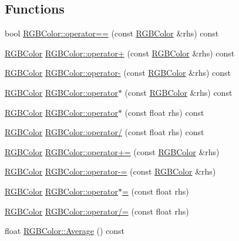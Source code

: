 \subsection*{Functions}
\begin{DoxyCompactItemize}
\item 
bool \hyperlink{group___utilities_ga51f2ca82bd3166f19e7327c8e5e5a068}{R\+G\+B\+Color\+::operator==} (const \hyperlink{class_r_g_b_color}{R\+G\+B\+Color} \&rhs) const
\item 
\hyperlink{class_r_g_b_color}{R\+G\+B\+Color} \hyperlink{group___utilities_gab8eb3021ce94a9a4fc7a1ba1e8c06a30}{R\+G\+B\+Color\+::operator+} (const \hyperlink{class_r_g_b_color}{R\+G\+B\+Color} \&rhs) const
\item 
\hyperlink{class_r_g_b_color}{R\+G\+B\+Color} \hyperlink{group___utilities_ga2d0a70444ca0c882f3a5dbed42787ef8}{R\+G\+B\+Color\+::operator-\/} (const \hyperlink{class_r_g_b_color}{R\+G\+B\+Color} \&rhs) const
\item 
\hyperlink{class_r_g_b_color}{R\+G\+B\+Color} \hyperlink{group___utilities_ga38cb49925dc77a366b56b546b7dd17ae}{R\+G\+B\+Color\+::operator$\ast$} (const \hyperlink{class_r_g_b_color}{R\+G\+B\+Color} \&rhs) const
\item 
\hyperlink{class_r_g_b_color}{R\+G\+B\+Color} \hyperlink{group___utilities_ga46707b8ca0c4b560914f2aae4ec31eb5}{R\+G\+B\+Color\+::operator$\ast$} (const float rhs) const
\item 
\hyperlink{class_r_g_b_color}{R\+G\+B\+Color} \hyperlink{group___utilities_ga932f5821d1c40799b6b40f2fe88b7070}{R\+G\+B\+Color\+::operator/} (const float rhs) const
\item 
\hyperlink{class_r_g_b_color}{R\+G\+B\+Color} \hyperlink{group___utilities_ga985586cc676498527d1597ab3beee728}{R\+G\+B\+Color\+::operator+=} (const \hyperlink{class_r_g_b_color}{R\+G\+B\+Color} \&rhs)
\item 
\hyperlink{class_r_g_b_color}{R\+G\+B\+Color} \hyperlink{group___utilities_ga1a36960da5c88b5e3e825ad01845de29}{R\+G\+B\+Color\+::operator-\/=} (const \hyperlink{class_r_g_b_color}{R\+G\+B\+Color} \&rhs)
\item 
\hyperlink{class_r_g_b_color}{R\+G\+B\+Color} \hyperlink{group___utilities_ga1b8ab73352d66c6d0125d6f061a1982f}{R\+G\+B\+Color\+::operator$\ast$=} (const float rhs)
\item 
\hyperlink{class_r_g_b_color}{R\+G\+B\+Color} \hyperlink{group___utilities_gad071890eadae01f96bf3af8ba52503e0}{R\+G\+B\+Color\+::operator/=} (const float rhs)
\item 
float \hyperlink{group___utilities_gaea22cae2344d4a4187b50732820e50c8}{R\+G\+B\+Color\+::\+Average} () const
\end{DoxyCompactItemize}


